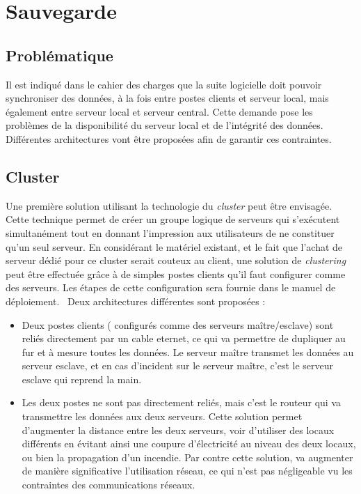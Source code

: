 \section{Sauvegarde}

% 

\subsection{Problématique}

Il est indiqué dans le cahier des charges que la suite logicielle doit pouvoir synchroniser des données, à la fois entre postes clients et serveur local, mais également entre serveur local et serveur central.
Cette demande pose les problèmes de la disponibilité du serveur local et de l'intégrité des données. Différentes architectures vont être proposées afin de garantir ces contraintes.

\subsection{Cluster}

Une première solution utilisant la technologie du \textit{cluster} peut être envisagée. Cette technique permet de créer un groupe logique de serveurs qui s'exécutent simultanément tout en donnant l'impression aux utilisateurs de ne constituer qu'un seul serveur.
En considérant le matériel existant, et le fait que l'achat de serveur dédié pour ce cluster serait couteux au client, une solution de \textit{clustering} peut être effectuée grâce à de simples postes clients qu'il faut configurer comme des serveurs. Les étapes de cette configuration sera fournie dans le manuel de déploiement.
\
Deux architectures différentes sont proposées :
\begin{itemize}
	\item Deux postes clients ( configurés comme des serveurs maître/esclave) sont reliés directement par un cable eternet, ce qui va permettre de dupliquer au fur et à mesure toutes les données. Le serveur maître transmet les données au serveur esclave, et en cas d'incident sur le serveur maître, c'est le serveur esclave qui reprend la main.
	\item Les deux postes ne sont pas directement reliés, mais c'est le routeur qui va transmettre les données aux deux serveurs. Cette  solution permet d'augmenter la distance entre les deux serveurs, voir d'utiliser des locaux différents en évitant ainsi une coupure d'électricité au niveau des deux locaux, ou bien la propagation d'un incendie. Par contre cette solution, va augmenter de manière significative l'utilisation réseau, ce qui n'est pas négligeable vu les contraintes des communications réseaux.
\end{itemize}

